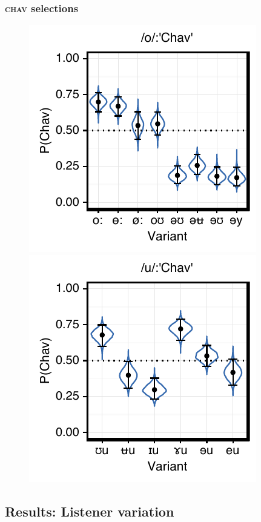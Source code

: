 \documentclass[PWPL]{article}
\begin{document}
\subsubsection{\textsc{chav} selections}
\begin{figure}[H]
\centering
\includegraphics[scale=0.8]{ow_chav.pdf}
\includegraphics[scale=0.8]{uw_chav.pdf}
\end{figure}
\subsection{Results: Listener variation}
\end{document}
